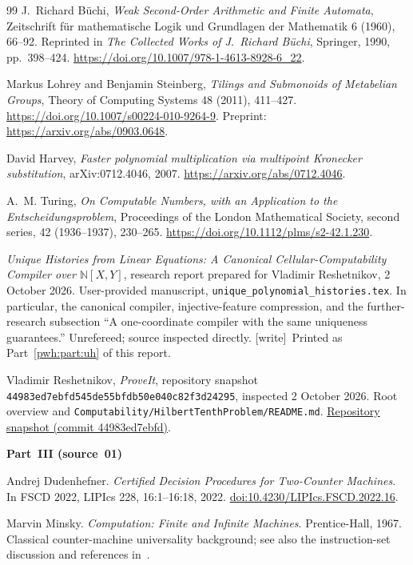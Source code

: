 \documentclass[11pt,letterpaper]{article}
\numberwithin{equation}{section}
\theoremstyle{definition}
\newcommand{\N}{\mathbb N}
\newcommand{\code}[1]{\texttt{\small #1}}
\newcommand{\wtag}{\textup{[write]}}
\begin{document}
\begin{thebibliography}{99}
J.~Richard B\"uchi,
\emph{Weak Second-Order Arithmetic and Finite Automata},
Zeitschrift f\"ur mathematische Logik und Grundlagen der Mathematik
6 (1960), 66--92.
Reprinted in \emph{The Collected Works of J.~Richard B\"uchi},
Springer, 1990, pp.~398--424.
\url{https://doi.org/10.1007/978-1-4613-8928-6_22}.

Markus Lohrey and Benjamin Steinberg,
\emph{Tilings and Submonoids of Metabelian Groups},
Theory of Computing Systems 48 (2011), 411--427.
\url{https://doi.org/10.1007/s00224-010-9264-9}.
Preprint: \url{https://arxiv.org/abs/0903.0648}.

David Harvey,
\emph{Faster polynomial multiplication via multipoint Kronecker substitution},
arXiv:0712.4046, 2007.
\url{https://arxiv.org/abs/0712.4046}.

A.~M. Turing,
\emph{On Computable Numbers, with an Application to the
Entscheidungsproblem},
Proceedings of the London Mathematical Society, second series,
42 (1936--1937), 230--265.
\url{https://doi.org/10.1112/plms/s2-42.1.230}.

\emph{Unique Histories from Linear Equations:
A Canonical Cellular-Computability Compiler over $\N[X,Y]$},
research report prepared for Vladimir Reshetnikov, 2 October 2026.
User-provided manuscript, \code{unique\_polynomial\_histories.tex}.
In particular, the canonical compiler, injective-feature compression,
and the further-research subsection ``A one-coordinate compiler with
the same uniqueness guarantees.'' Unrefereed; source inspected directly.
\wtag\ Printed as Part~\ref{pwh:part:uh} of this report.

Vladimir Reshetnikov,
\emph{ProveIt}, repository snapshot
\texttt{44983ed7ebfd545de55bfdb50e040c82f3d24295}, inspected 2 October 2026.
Root overview and \code{Computability/HilbertTenthProblem/README.md}.
\href{https://github.com/VladimirReshetnikov/ProveIt/tree/44983ed7ebfd545de55bfdb50e040c82f3d24295}{Repository snapshot (commit 44983ed7ebfd)}.

\item[] \textbf{Part~III (source~01)}

Andrej Dudenhefner.
\emph{Certified Decision Procedures for Two-Counter Machines}.
In FSCD 2022, LIPIcs 228, 16:1--16:18, 2022.
\href{https://doi.org/10.4230/LIPIcs.FSCD.2022.16}{doi:10.4230/LIPIcs.FSCD.2022.16}.

Marvin Minsky.
\emph{Computation: Finite and Infinite Machines}.
Prentice-Hall, 1967.
Classical counter-machine universality background; see also the
instruction-set discussion and references in~\cite{bt:dudenhefner}.


\end{thebibliography}
\end{document}
